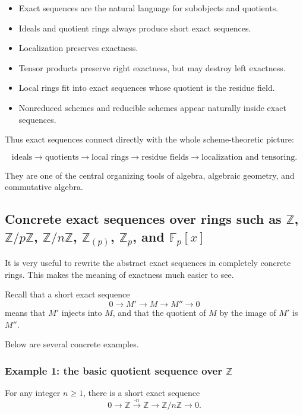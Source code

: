 \documentclass[12pt,a4paper]{article}
\theoremstyle{notespace}
\theoremstyle{definition}
\begin{document}
\begin{itemize}
	\item Exact sequences are the natural language for subobjects and quotients.
	\item Ideals and quotient rings always produce short exact sequences.
	\item Localization preserves exactness.
	\item Tensor products preserve right exactness, but may destroy left exactness.
	\item Local rings fit into exact sequences whose quotient is the residue field.
	\item Nonreduced schemes and reducible schemes appear naturally inside exact sequences.
\end{itemize}

Thus exact sequences connect directly with the whole scheme-theoretic picture:

\[
\text{ideals}
\longrightarrow
\text{quotients}
\longrightarrow
\text{local rings}
\longrightarrow
\text{residue fields}
\longrightarrow
\text{localization and tensoring}.
\]

They are one of the central organizing tools of algebra, algebraic geometry, and commutative algebra.

\subsection{Concrete exact sequences over rings such as \(\mathbb Z\), \(\mathbb Z/p\mathbb Z\), \(\mathbb Z/n\mathbb Z\), \(\mathbb Z_{(p)}\), \(\mathbb Z_p\), and \(\mathbb F_p[x]\)}

It is very useful to rewrite the abstract exact sequences in completely concrete rings.  
This makes the meaning of exactness much easier to see.

Recall that a short exact sequence
\[
0 \longrightarrow M' \longrightarrow M \longrightarrow M'' \longrightarrow 0
\]
means that \(M'\) injects into \(M\), and that the quotient of \(M\) by the image of \(M'\) is \(M''\).

Below are several concrete examples.

\subsubsection{Example 1: the basic quotient sequence over \(\mathbb Z\)}

For any integer \(n\geq 1\), there is a short exact sequence
\[
0 \longrightarrow \mathbb Z \xrightarrow{\cdot n} \mathbb Z \longrightarrow \mathbb Z/n\mathbb Z \longrightarrow 0.
\]
\end{document}
